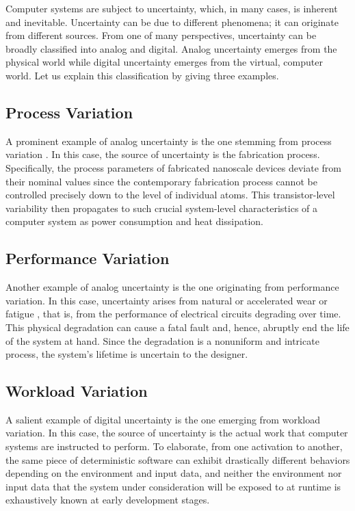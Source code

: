 Computer systems are subject to uncertainty, which, in many cases, is inherent
and inevitable. Uncertainty can be due to different phenomena; it can originate
from different sources. From one of many perspectives, uncertainty can be
broadly classified into analog and digital. Analog uncertainty emerges from the
physical world while digital uncertainty emerges from the virtual, computer
world. Let us explain this classification by giving three examples.

\subsection{Process Variation}

A prominent example of analog uncertainty is the one stemming from process
variation \cite{srivastava2010}. In this case, the source of uncertainty is the
fabrication process. Specifically, the process parameters of fabricated
nanoscale devices deviate from their nominal values since the contemporary
fabrication process cannot be controlled precisely down to the level of
individual atoms. This transistor-level variability then propagates to such
crucial system-level characteristics of a computer system as power consumption
and heat dissipation.

\subsection{Performance Variation}

Another example of analog uncertainty is the one originating from performance
variation. In this case, uncertainty arises from natural or accelerated wear or
fatigue \cite{jedec2016}, that is, from the performance of electrical circuits
degrading over time. This physical degradation can cause a fatal fault and,
hence, abruptly end the life of the system at hand. Since the degradation is a
nonuniform and intricate process, the system's lifetime is uncertain to the
designer.

\subsection{Workload Variation}

A salient example of digital uncertainty is the one emerging from workload
variation. In this case, the source of uncertainty is the actual work that
computer systems are instructed to perform. To elaborate, from one activation to
another, the same piece of deterministic software can exhibit drastically
different behaviors depending on the environment and input data, and neither the
environment nor input data that the system under consideration will be exposed
to at runtime is exhaustively known at early development stages.

